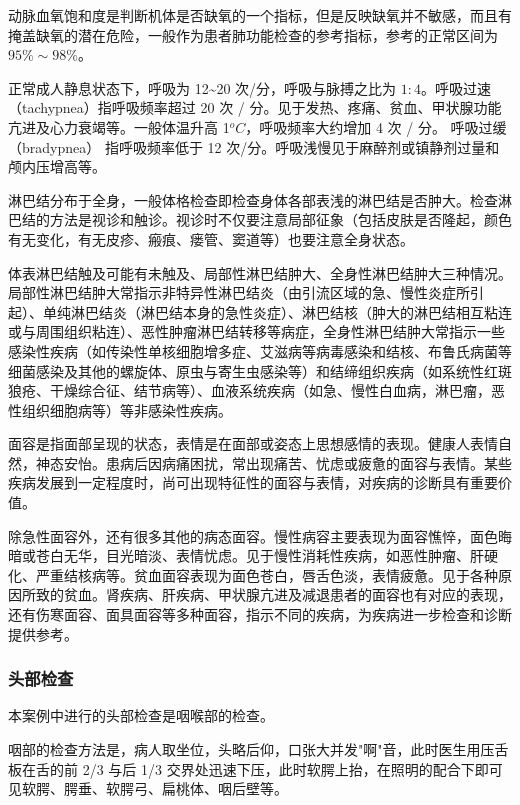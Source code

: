\documentclass[9pt,a4paper,twoside]{rho-class/rho}
\begin{document}
    动脉血氧饱和度是判断机体是否缺氧的一个指标，但是反映缺氧并不敏感，而且有掩盖缺氧的潜在危险，一般作为患者肺功能检查的参考指标，参考的正常区间为$95\%\sim98\%$。

    正常成人静息状态下，呼吸为 12\textasciitilde20 次/分，呼吸与脉搏之比为 $1:4$。呼吸过速（tachypnea）指呼吸频率超过 20 次 / 分。见于发热、疼痛、贫血、甲状腺功能亢进及心力衰竭等。一般体温升高 1$^oC$，呼吸频率大约增加 4 次 / 分。 呼吸过缓（bradypnea） 指呼吸频率低于 12 次/分。呼吸浅慢见于麻醉剂或镇静剂过量和颅内压增高等。

    淋巴结分布于全身，一般体格检查即检查身体各部表浅的淋巴结是否肿大。检查淋巴结的方法是视诊和触诊。视诊时不仅要注意局部征象（包括皮肤是否隆起，颜色有无变化，有无皮疹、瘢痕、瘘管、窦道等）也要注意全身状态。

    体表淋巴结触及可能有未触及、局部性淋巴结肿大、全身性淋巴结肿大三种情况。局部性淋巴结肿大常指示非特异性淋巴结炎（由引流区域的急、慢性炎症所引起）、单纯淋巴结炎（淋巴结本身的急性炎症）、淋巴结核（肿大的淋巴结相互粘连或与周围组织粘连）、恶性肿瘤淋巴结转移等病症，全身性淋巴结肿大常指示一些感染性疾病（如传染性单核细胞增多症、艾滋病等病毒感染和结核、布鲁氏病菌等细菌感染及其他的螺旋体、原虫与寄生虫感染等）和结缔组织疾病（如系统性红斑狼疮、干燥综合征、结节病等）、血液系统疾病（如急、慢性白血病，淋巴瘤，恶性组织细胞病等）等非感染性疾病。

    面容是指面部呈现的状态，表情是在面部或姿态上思想感情的表现。健康人表情自然，神态安怡。患病后因病痛困扰，常出现痛苦、忧虑或疲惫的面容与表情。某些疾病发展到一定程度时，尚可出现特征性的面容与表情，对疾病的诊断具有重要价值。

    除急性面容外，还有很多其他的病态面容。慢性病容主要表现为面容憔悴，面色晦暗或苍白无华，目光暗淡、表情忧虑。见于慢性消耗性疾病，如恶性肿瘤、肝硬化、严重结核病等。贫血面容表现为面色苍白，唇舌色淡，表情疲惫。见于各种原因所致的贫血。肾疾病、肝疾病、甲状腺亢进及减退患者的面容也有对应的表现，还有伤寒面容、面具面容等多种面容，指示不同的疾病，为疾病进一步检查和诊断提供参考。

    
    \subsubsection{头部检查}

    本案例中进行的头部检查是咽喉部的检查。

    咽部的检查方法是，病人取坐位，头略后仰，口张大并发"啊"音，此时医生用压舌板在舌的前 2/3 与后 1/3 交界处迅速下压，此时软腭上抬，在照明的配合下即可见软腭、腭垂、软腭弓、扁桃体、咽后壁等。
\end{document}
